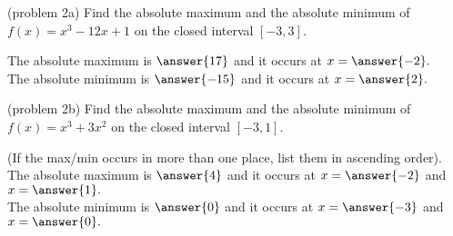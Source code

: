 \documentclass{ximera}
\begin{document}
\begin{problem}(problem 2a)
Find the absolute maximum and the absolute minimum of $f(x) = x^3 - 12x + 1$
on the closed interval $[-3, 3]$.

The absolute maximum is $\answer{17}$ and it occurs at $x = \answer{-2}.$\\
The absolute minimum is $\answer{-15}$ and it occurs at $x = \answer{2}.$ 
\end{problem}

\begin{problem}(problem 2b)
Find the absolute maximum and the absolute minimum of $f(x) = x^3 + 3x^2$
on the closed interval $[-3, 1]$.

(If the max/min occurs in more than one place, list them in 
ascending order).\\
The absolute maximum is $\answer{4}$ and it occurs at $x = \answer{-2}$
and $x=\answer{1}.$
\\
The absolute minimum is $\answer{0}$ and it occurs at $x = \answer{-3}$
and $x=\answer{0}.$ 
\end{problem}
\end{document}
